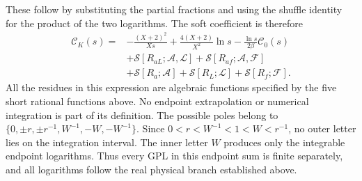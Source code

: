 These follow by substituting the partial fractions and using the shuffle
identity for the product of the two logarithms. The soft coefficient is
therefore
\begin{equation}
\begin{aligned}
 \mathcal C_K(s)={}&-\frac{(X+2)^2}{Xs}
 +\frac{4(X+2)}{X^2}\ln s
 -\frac{\ln s}{2\beta}\mathcal C_0(s)\\
 &+\mathcal S[R_{aL};\mathcal A,\mathcal L]
  +\mathcal S[R_{af};\mathcal A,\mathcal F]\\
 &+\mathcal S[R_a;\mathcal A]
  +\mathcal S[R_L;\mathcal L]
  +\mathcal S[R_f;\mathcal F].
\end{aligned}
\label{eq:comp-ck-collected-finite-gpl}
\end{equation}
All the residues in this expression are algebraic functions specified
by the five short rational functions above. No endpoint extrapolation
or numerical integration is part of its definition.
The possible poles belong to
$\{0,\pm r,\pm r^{-1},W^{-1},-W,-W^{-1}\}$.
Since $0<r<W^{-1}<1<W<r^{-1}$, no outer letter lies on the
integration interval. The inner letter $W$ produces only the
integrable endpoint logarithms. Thus every GPL in this endpoint sum
is finite separately, and all logarithms follow the real physical
branch established above.
